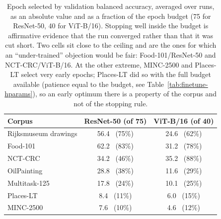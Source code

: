 \begin{table}[t]
\centering
\caption{Epoch selected by validation balanced accuracy, averaged over runs, as
an absolute value and as a fraction of the epoch budget (75 for ResNet-50, 40
for ViT-B/16). Stopping well inside the budget is affirmative evidence that the
run converged rather than that it was cut short. Two cells sit close to the
ceiling and are the ones for which an ``under-trained'' objection would be
fair: Food-101/ResNet-50 and NCT-CRC/ViT-B/16. At the other extreme, MINC-2500
and Places-LT select very early epochs; Places-LT did so with the full budget
available (patience equal to the budget, see Table~\ref{tab:finetune-hparams}),
so an early optimum there is a property of the corpus and not of the stopping
rule.}
\label{tab:finetune-epoch}
\small
\begin{tabular}{lcc}
\toprule
\textbf{Corpus} & \textbf{ResNet-50 (of 75)} & \textbf{ViT-B/16 (of 40)} \\
\midrule
Rijksmuseum drawings & 56.4 \, (75\%) & 24.6 \, (62\%) \\
Food-101             & 62.2 \, (83\%) & 31.2 \, (78\%) \\
NCT-CRC              & 34.2 \, (46\%) & 35.2 \, (88\%) \\
OilPainting          & 28.8 \, (38\%) & 11.6 \, (29\%) \\
Multitask-125        & 17.8 \, (24\%) & 10.1 \, (25\%) \\
Places-LT            &  8.4 \, (11\%) &  6.0 \, (15\%) \\
MINC-2500            &  7.6 \, (10\%) &  4.6 \, (12\%) \\
\bottomrule
\end{tabular}
\end{table}
